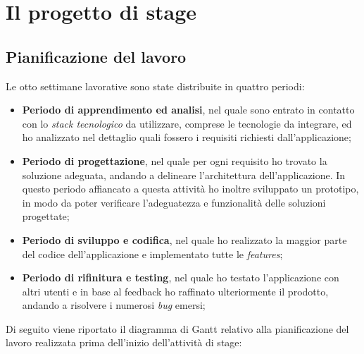 
\chapter{Il progetto di stage}
\label{cap:descrizione-stage}

\section{Pianificazione del lavoro}

Le otto settimane lavorative sono state distribuite in quattro periodi:

\begin{itemize}

\item \textbf{Periodo di apprendimento ed analisi}, nel quale sono entrato in contatto con lo \textit{stack tecnologico} da utilizzare, comprese le tecnologie da integrare, ed ho analizzato nel dettaglio quali fossero i requisiti richiesti dall'applicazione;
\item \textbf{Periodo di progettazione}, nel quale per ogni requisito ho trovato la soluzione adeguata, andando a delineare l'architettura dell'applicazione. In questo periodo affiancato a questa attività ho inoltre sviluppato un prototipo, in modo da poter verificare l'adeguatezza e funzionalità delle soluzioni progettate;
\item \textbf{Periodo di sviluppo e codifica}, nel quale ho realizzato la maggior parte del codice dell'applicazione e implementato tutte le \textit{features};
\item \textbf{Periodo di rifinitura e testing}, nel quale ho testato l'applicazione con altri utenti e in base al feedback ho raffinato ulteriormente il prodotto, andando a risolvere i numerosi \textit{bug} emersi;

\end{itemize}

Di seguito viene riportato il diagramma di Gantt relativo alla pianificazione del lavoro realizzata prima dell'inizio dell'attività di stage:

